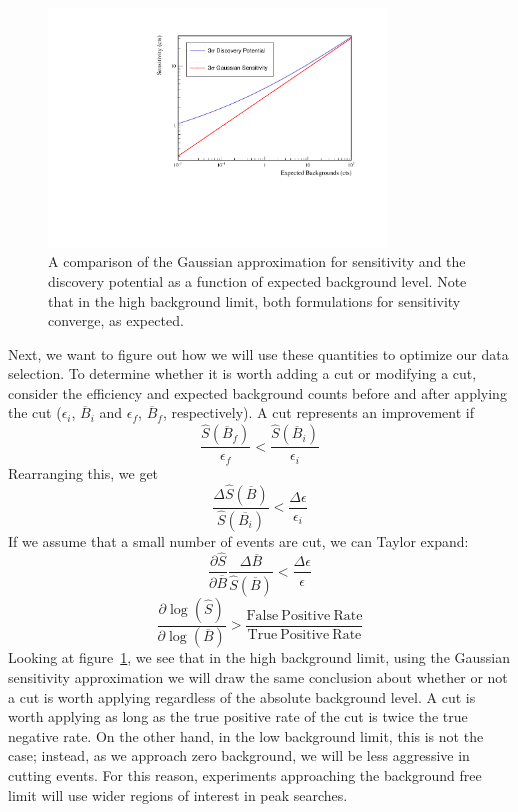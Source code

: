 \documentclass[notitlepage,rmp,aps,10pt]{revtex4-1}
\begin{document}
\begin{figure}[h]
  \centering
  \includegraphics[width=0.8\textwidth]{DPvSens}
  \caption{\label{fig:DPvSens}
    A comparison of the Gaussian approximation for sensitivity and the discovery potential as a function of expected background level. Note that in the high background limit, both formulations for sensitivity converge, as expected.
    }
\end{figure}
Next, we want to figure out how we will use these quantities to optimize our data selection.
To determine whether it is worth adding a cut or modifying a cut, consider the efficiency and expected background counts before and after applying the cut ($\epsilon_i$, $\overline{B}_i$ and $\epsilon_f$, $\overline{B}_f$, respectively).
A cut represents an improvement if
\begin{equation}
  \frac{\hat{S}(\overline{B}_f)}{\epsilon_f} <\frac{\hat{S}(\overline{B}_i)}{\epsilon_i}
\end{equation}
Rearranging this, we get
\begin{equation}
  \frac{\Delta \hat{S}(\overline{B})}{\hat{S}(\overline{B_i})} < \frac{\Delta\epsilon}{\epsilon_i}
\end{equation}
If we assume that a small number of events are cut, we can Taylor expand:
\begin{equation} \label{eq:cutcriterion}
  \frac{\partial\hat{S}}{\partial\overline{B}} \frac{\Delta\overline{B}}{\hat{S}(\overline{B})} < \frac{\Delta\epsilon}{\epsilon}
\end{equation}
\begin{equation}
  \frac{\partial\log(\hat{S})}{\partial\log(\overline{B})} > \frac{\mathrm{False~Positive~Rate}}{\mathrm{True~Positive~Rate}}
\end{equation}
Looking at figure~\ref{fig:DPvSens}, we see that in the high background limit, using the Gaussian sensitivity approximation we will draw the same conclusion about whether or not a cut is worth applying regardless of the absolute background level.
A cut is worth applying as long as the true positive rate of the cut is twice the true negative rate.
On the other hand, in the low background limit, this is not the case; instead, as we approach zero background, we will be less aggressive in cutting events.
For this reason, experiments approaching the background free limit will use wider regions of interest in peak searches.
\end{document}
